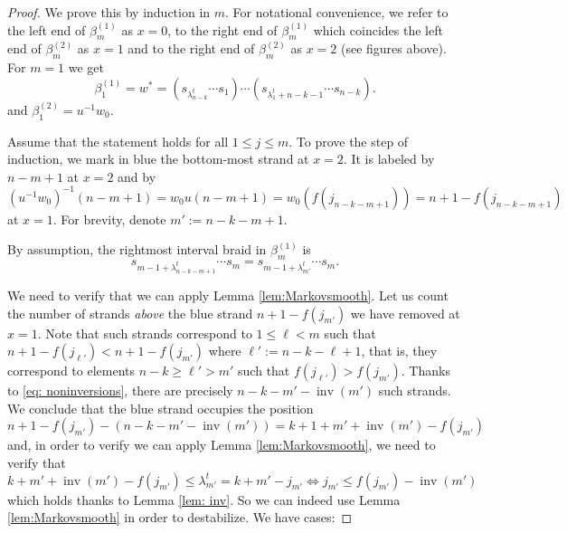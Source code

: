 \documentclass[10pt,a4paper]{amsart}
\DeclareMathOperator{\inv}{inv}
\begin{document}
\begin{proof}
We prove this by induction in $m$. For notational convenience, we refer to the left end of $\beta^{(1)}_{m}$ as $x=0$, to the right end of $\beta^{(1)}_{m}$ which coincides the left end of $\beta^{(2)}_{m}$ as $x=1$ and to the right end of $\beta^{(2)}_{m}$ as $x=2$ (see figures above). For $m=1$ we get
\begin{equation}\label{eq: w0ww0}
\beta^{(1)}_{1}=w^*= \left(s_{\lambda^{t}_{n-k}}\cdots s_1\right)\cdots\left(s_{\lambda_{1}^{t} + n - k -1}\cdots s_{n-k}\right). 
\end{equation}
and $\beta^{(2)}_{1}=u^{-1}w_0$. 

Assume that the statement holds for all $1 \leq j \leq m$.
To prove the step of induction, we mark in blue the bottom-most strand at $x=2$. It is labeled by $n-m+1$ at $x=2$ and by $(u^{-1}w_0)^{-1}(n-m+1)  = w_0u(n-m+1) = w_0(f(j_{n-k-m+1})) = n+1-f(j_{n-k-m+1})$ at $x=1$. For brevity, denote $m' := n-k-m+1$.

By assumption, the rightmost interval braid in $\beta^{(1)}_{m}$ is
\begin{equation}\label{eq: m step}
s_{m-1+\lambda^{t}_{n-k-m+1}}\cdots s_{m}=s_{m-1+\lambda^{t}_{m'}}\cdots s_{m}.
\end{equation}

We need to verify that we can apply Lemma \ref{lem:Markovsmooth}. Let us count the number of strands \emph{above} the blue strand $n+1-f(j_{m'})$ we have removed at $x=1$. Note that such strands correspond to $1 \leq \ell < m$ such that $n+1-f(j_{\ell'}) < n+1-f(j_{m'})$ where $\ell' :=  n-k-\ell+1$, that is, they correspond to elements $n - k \geq \ell' > m'$ such that $f(j_{\ell'}) > f(j_{m'})$. Thanks to \eqref{eq: noninversions}, there are precisely $n-k-m'-\inv(m')$ such strands. We conclude that the blue strand occupies the position
\[
n + 1 - f(j_{m'}) - (n-k-m' - \inv(m')) = k+1+m'+\inv(m') - f(j_{m'})
\]
and, in order to verify we can apply Lemma \ref{lem:Markovsmooth}, we need to verify that 
\[
k+m'+\inv(m') - f(j_{m'}) \leq \lambda^{t}_{m'} = k+m'-j_{m'} \Leftrightarrow j_{m'} \leq f(j_{m'}) - \inv(m')
\]
which holds thanks to Lemma \ref{lem: inv}. So we can indeed use Lemma \ref{lem:Markovsmooth} in order to destabilize. We have cases:


\end{proof}
\end{document}
